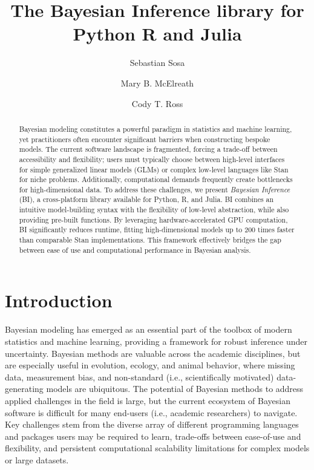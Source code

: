 \documentclass[num-refs]{wiley-article}
\title{The Bayesian Inference library for Python R and Julia}
\author[1]{Sebastian Sosa}
\author[1,2]{Mary B. McElreath}
\author[1]{Cody T. Ross}
\affil[1]{Department of Human Behavior, Ecology and Culture. Max Planck Institute for Evolutionary Anthropology. Leipzig, Germany }
\affil[2]{Department of Human Behavior, Ecology and Culture. Max Planck Institute for Evolutionary Anthropology. Leipzig, Germany }
\begin{document}
\begin{frontmatter}
\maketitle

\begin{abstract}

Bayesian modeling constitutes a powerful paradigm in statistics and machine learning, yet practitioners often encounter significant barriers when constructing bespoke models. The current software landscape is fragmented, forcing a trade-off between accessibility and flexibility; users must typically choose between high-level interfaces for simple generalized linear models (GLMs) or complex low-level languages like Stan for niche problems. Additionally, computational demands frequently create bottlenecks for high-dimensional data. To address these challenges, we present \textit{Bayesian Inference} (BI), a cross-platform library available for Python, R, and Julia. BI combines an intuitive model-building syntax with the flexibility of low-level abstraction, while also providing pre-built functions. By leveraging hardware-accelerated GPU computation, BI significantly reduces runtime, fitting high-dimensional models up to 200 times faster than comparable Stan implementations. This framework effectively bridges the gap between ease of use and computational performance in Bayesian analysis.


\end{abstract}
\end{frontmatter}



\section{Introduction}\label{introduction}

Bayesian modeling has emerged as an essential part of the toolbox of modern statistics and machine learning, providing a framework for robust inference under uncertainty. Bayesian methods are valuable across the academic disciplines, but are especially useful in evolution, ecology, and animal behavior, where missing data, measurement bias, and non-standard (i.e., scientifically motivated) data-generating models are ubiquitous. The potential of Bayesian methods to address applied challenges in the field is large, but the current ecosystem of Bayesian software is difficult for many end-users (i.e., academic researchers) to navigate. Key challenges stem from the diverse array of different programming languages and packages users may be required to learn, trade-offs between ease-of-use and flexibility, and persistent computational scalability limitations for complex models or large datasets.
\end{document}
